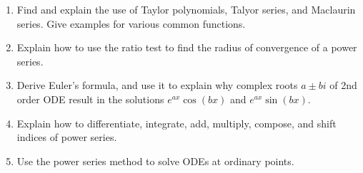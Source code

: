 
\begin{enumerate}
\item Find and explain the use of Taylor polynomials, Talyor series, and Maclaurin series. Give examples for various common functions.
\item Explain how to use the ratio test to find the radius of convergence of a power series. 
\item Derive Euler's formula, and use it to explain why complex roots $a\pm bi$ of 2nd order ODE result in the solutions $e^{ax}\cos(bx)$ and $e^{ax}\sin(bx)$.
\item Explain how to differentiate, integrate, add, multiply, compose, and shift indices of power series.
\item Use the power series method to solve ODEs at ordinary points.
\end{enumerate}

